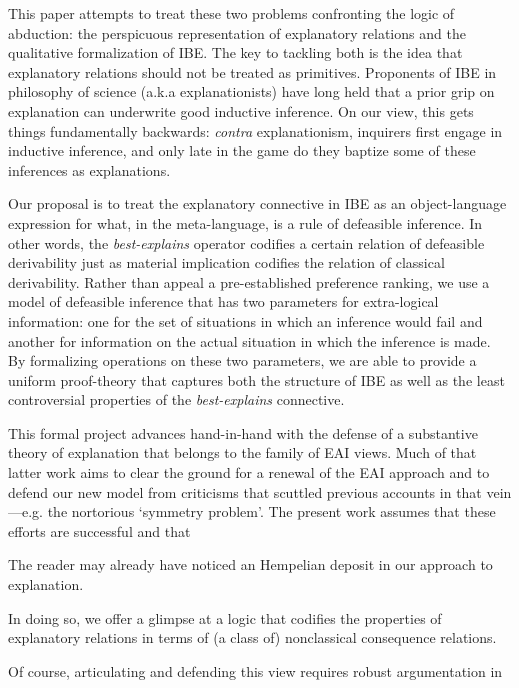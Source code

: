 \documentclass{article}
\theoremstyle{definition}
\theoremstyle{definition}
\theoremstyle{definition}
\theoremstyle{definition}
\theoremstyle{remark}
\theoremstyle{definition}
\theoremstyle{definition}
\begin{document}
This paper attempts to treat these two problems confronting the logic of abduction: the perspicuous representation of explanatory relations and the qualitative formalization of IBE. The key to tackling both is the idea that explanatory relations should not be treated as primitives. Proponents of IBE in philosophy of science (a.k.a explanationists) have long held that a prior grip on explanation can underwrite good inductive inference. On our view, this  gets things fundamentally backwards: \textit{contra} explanationism, inquirers first engage in inductive inference, and only late in the game do they baptize some of these inferences as explanations. 

Our proposal is to treat the explanatory connective in IBE as an object-language expression for what, in the meta-language, is a rule of defeasible inference. In other words, the \textit{best-explains} operator codifies a certain relation of defeasible derivability just as material implication codifies the relation of classical derivability.  Rather than appeal a pre-established preference ranking, we use a model of defeasible inference that has two parameters for extra-logical information: one for the set of situations in which an inference would fail and another for information on the actual situation in which the inference is made. By formalizing operations on these two parameters, we are able to provide a uniform proof-theory that captures both the structure of IBE as well as the least controversial properties of the \textit{best-explains} connective.

This formal project advances hand-in-hand with the defense of a substantive theory of explanation that belongs to the family of EAI views. Much of that latter work aims to clear the ground for a renewal of the EAI approach and to defend our new model from criticisms that scuttled previous accounts in that vein---e.g. the nortorious `symmetry problem'. The present work assumes that these efforts are successful and that 

The reader may already have noticed an Hempelian deposit in our approach to explanation.  





 In doing so, we offer a glimpse at a logic that codifies the properties of explanatory relations in terms of (a class of) nonclassical consequence relations.


Of course, articulating and defending this view requires robust argumentation in
\end{document}
